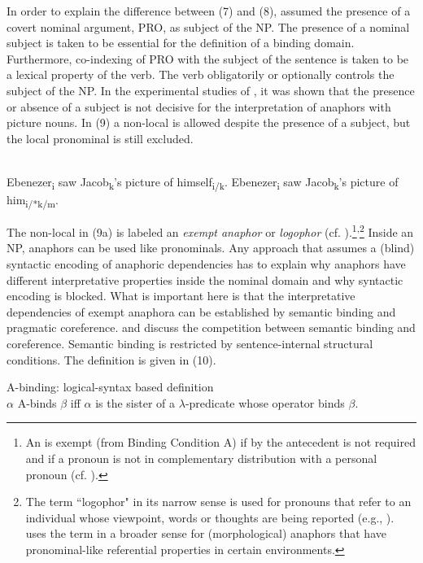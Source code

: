\documentclass[output=paper]{langsci/langscibook}
\begin{document}
In order to explain the difference between (7) and (8), \citet{Chomsky1986Knowledge} assumed the presence of a covert nominal argument, PRO, as subject of the NP. The presence of a nominal subject is taken to be essential for the definition of a binding domain. Furthermore, co-indexing of PRO with the subject of the sentence is taken to be a lexical property of the verb. The verb obligatorily or optionally controls the subject of the NP. In the experimental studies of \citet{Runner2005}, it was shown that the presence or absence of a subject is not decisive for the interpretation of anaphors with picture nouns. In (9) a non-local  is allowed despite the presence of a subject, but the local pronominal is still excluded.

\ea%
    \citet[597]{Runner2005}\label{ex:wein:9}\\
    \ea Ebenezer\textsubscript{i} saw Jacob\textsubscript{k}'s picture of himself\textsubscript{i/k}.
    \ex Ebenezer\textsubscript{i} saw Jacob\textsubscript{k}'s picture of him\textsubscript{i/*k/m}.
    \z
\z    

The non-local  in (9a) is labeled an \textit{exempt anaphor} or \textit{logophor} (cf. \citealt{Reuland2011}).\footnote{An  is exempt (from Binding Condition A) if  by the antecedent is not required and if a  pronoun is not in complementary distribution with a personal pronoun (cf. \citealt{Büring2005}).}\textsuperscript{,}\footnote{The term “logophor" in its narrow sense is used for pronouns that refer to an individual whose viewpoint, words or thoughts are being reported (e.g., \citealt{Speas2004}). \citet{Reuland2011} uses the term in a broader sense for (morphological) anaphors that have pronominal-like referential properties in certain environments.}  Inside an NP, anaphors can be used like pronominals. Any approach that assumes a (blind) syntactic encoding of anaphoric dependencies has to explain why anaphors have different interpretative properties inside the nominal domain and why syntactic encoding is blocked. What is important here is that the interpretative dependencies of exempt anaphora can be established by semantic binding and pragmatic coreference. \citet{Reinhart2006} and \citet{Reuland2011} discuss the competition between semantic binding and coreference. Semantic binding is restricted by sentence-internal structural conditions. The definition is given in (10). 

\ea%
    \label{ex:wein:10}
    A-binding: logical-syntax based definition \citep[171]{Reinhart2006}\\
    $\alpha $ A-binds $\beta $ iff $\alpha $ is the sister of a $\lambda $-predicate whose operator binds $\beta $.
\z
\end{document}
